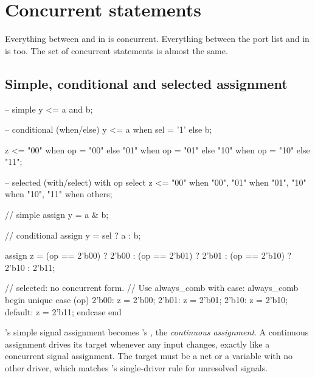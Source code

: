 \section{Concurrent statements}
\label{sec:rosetta:concurrent}

Everything between  and  in \VHDL{} is
concurrent. Everything between the port list and  in \SV{} is
too. The set of concurrent statements is almost the same.

\subsection{Simple, conditional and selected assignment}

\begin{rosetta}
\begin{rleft}
-- simple
y <= a and b;

-- conditional (when/else)
y <= a when sel = '1' else b;

z <= "00" when op = "00" else
     "01" when op = "01" else
     "10" when op = "10" else
     "11";

-- selected (with/select)
with op select z <=
  "00" when "00",
  "01" when "01",
  "10" when "10",
  "11" when others;
\end{rleft}
\begin{rright}
// simple
assign y = a & b;

// conditional
assign y = sel ? a : b;

assign z = (op == 2'b00) ? 2'b00 :
           (op == 2'b01) ? 2'b01 :
           (op == 2'b10) ? 2'b10 :
                           2'b11;

// selected: no concurrent form.
// Use always_comb with case:
always_comb begin
  unique case (op)
    2'b00: z = 2'b00;
    2'b01: z = 2'b01;
    2'b10: z = 2'b10;
    default: z = 2'b11;
  endcase
end
\end{rright}
\end{rosetta}


\VHDL{}'s simple signal assignment becomes \SV{}'s , the
\emph{continuous assignment}. A continuous assignment drives its target
whenever any input changes, exactly like a concurrent signal assignment. The
target must be a net or a variable with no other driver, which matches
\VHDL{}'s single-driver rule for unresolved signals.

